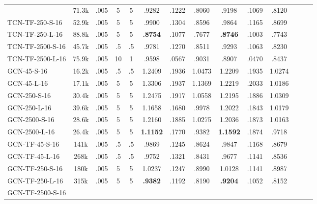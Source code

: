 \begin{table*}[h]
\begin{tabular}{lccccccccccccc}
            & 71.3k & .005 & 5 & 5 & .9282 & .1222 & .8060 & .9198 & .1069 & .8120 & \\
        TCN-TF-250-S-16               
            & 52.9k & .005 & 5 & 5 & .9900 & .1304 & .8596 & .9864 & .1165 & .8699 & \\
        TCN-TF-250-L-16               
            & 88.8k & .005 & 5 & 5 & \textbf{.8754} & .1077 & .7677 & \textbf{.8746} & .1003 & .7743 & \\
        TCN-TF-2500-S-16               
            & 45.7k & .005 & .5 & .5 & .9781 & .1270 & .8511 & .9293 & .1063 & .8230 & \\
        TCN-TF-2500-L-16               
            & 75.9k & .005 & 10 & 1 & .9598 & .0567 & .9031 & .8907 & .0470 & .8437 & \\
        \midrule
        GCN-45-S-16               
            & 16.2k & .005 & .5 & .5 & 1.2409 & .1936 & 1.0473 & 1.2209 & .1935 & 1.0274 & \\ 
        GCN-45-L-16               
            & 17.1k & .005 & 5 & 5 & 1.3306 & .1937 & 1.1369 & 1.2219 & .2033 & 1.0186 & \\
        GCN-250-S-16               
            & 30.4k & .005 & 5 & 5 & 1.2475 & .1917 & 1.0558 & 1.2195 & .1886 & 1.0309 & \\ 
        GCN-250-L-16               
            & 39.6k & .005 & 5 & 5 & 1.1658 & .1680 & .9978 & 1.2022 & .1843 & 1.0179 & \\
        GCN-2500-S-16               
            & 28.6k & .005 & 5 & 5 & 1.2160 & .1885 & 1.0275 & 1.2036 & .1873 & 1.0163 & \\ 
        GCN-2500-L-16               
            & 26.4k & .005 & 5 & 5 & \textbf{1.1152} & .1770 & .9382 & \textbf{1.1592} & .1874 & .9718 & \\
        \midrule
        GCN-TF-45-S-16               
            & 141k & .005 & .5 & .5 & .9869 & .1245 & .8624 & .9847 & .1168 & .8679 & \\
        GCN-TF-45-L-16               
            & 268k & .005 & .5 & .5 & .9752 & .1321 & .8431 & .9677 & .1141 & .8536 & \\
        GCN-TF-250-S-16               
            & 180k & .005 & 5 & 5 & 1.0237 & .1247 & .8990 & 1.0128 & .1141 & .8987 & \\
        GCN-TF-250-L-16               
            & 315k & .005 & 5 & 5 & \textbf{.9382} & .1192 & .8190 & \textbf{.9204} & .1052 & .8152 & \\
        GCN-TF-2500-S-16               

\end{tabular}
\end{table*}
